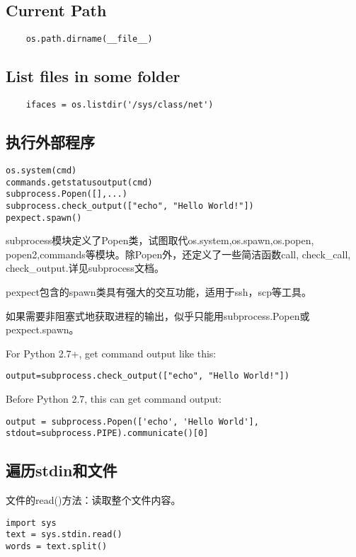 \subsection{Current Path}
\begin{lstlisting}
    os.path.dirname(__file__)
\end{lstlisting}


\subsection{List files in some folder}
\begin{lstlisting}
	ifaces = os.listdir('/sys/class/net')
\end{lstlisting}

\subsection{执行外部程序}
\begin{verbatim}
os.system(cmd)
commands.getstatusoutput(cmd)
subprocess.Popen([],...)
subprocess.check_output(["echo", "Hello World!"])
pexpect.spawn()
\end{verbatim}
subprocess模块定义了Popen类，试图取代os.system,os.spawn,os.popen, popen2,commands等模块。除Popen外，还定义了一些简洁函数call, check\_call, check\_output.详见subprocess文档。

pexpect包含的spawn类具有强大的交互功能，适用于ssh，scp等工具。

如果需要非阻塞式地获取进程的输出，似乎只能用subprocess.Popen或pexpect.spawn。

For Python 2.7+, get command output like this:
\begin{lstlisting}
output=subprocess.check_output(["echo", "Hello World!"])
\end{lstlisting}

Before Python 2.7, this can get command output:
\begin{lstlisting}
output = subprocess.Popen(['echo', 'Hello World'], stdout=subprocess.PIPE).communicate()[0]
\end{lstlisting}



\subsection{遍历stdin和文件}

文件的read()方法：读取整个文件内容。
\begin{verbatim}
import sys
text = sys.stdin.read()
words = text.split()
\end{verbatim}


